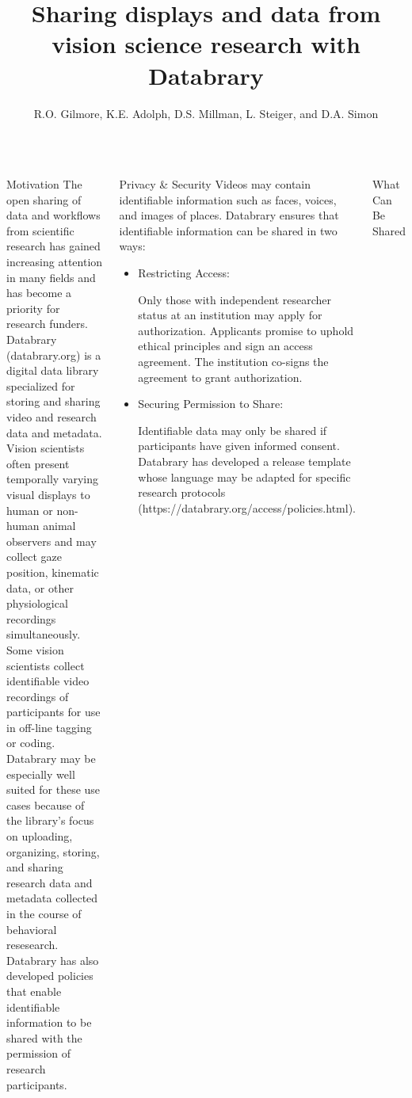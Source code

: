 \documentclass[final]{beamer}
\title{Sharing displays and data from vision science research with Databrary}
\author{R.O. Gilmore, K.E. Adolph, D.S. Millman, L. Steiger, and D.A. Simon}
\date{}
\begin{document}
\begin{frame}{} 

\begin{columns}[t]
		\begin{block}{Motivation}
			The open sharing of data and workflows from scientific research has gained increasing attention in many fields and has become a priority for research funders. 
			Databrary (databrary.org) is a digital data library specialized for storing and sharing video and research data and metadata. Vision scientists often present temporally varying visual displays to human or non-human animal observers and may collect gaze position, kinematic data, or other physiological recordings simultaneously. 
			Some vision scientists collect identifiable video recordings of participants for use in off-line tagging or coding. 
			Databrary may be especially well suited for these use cases because of the library's focus on uploading, organizing, storing, and sharing research data and metadata collected in the course of behavioral resesearch. 
			Databrary has also developed policies that enable identifiable information to be shared with the permission of research participants. 
		\end{block}
		\begin{block}{Privacy \& Security}
			Videos may contain identifiable information such as faces, voices, and images of places. 
			Databrary ensures that identifiable information can be shared in two ways:
			\begin{itemize}
			\item Restricting Access:
				\begin{indent}
					Only those with independent researcher status at an institution may apply for authorization. 
					Applicants promise to uphold ethical principles and sign an access agreement. The institution co-signs the agreement to grant authorization.
				\end{indent}
			\item Securing Permission to Share:
				\begin{indent}
					Identifiable data may only be shared if participants have given informed consent.
					Databrary has developed a release template whose language may be adapted for specific research protocols (https://databrary.org/access/policies.html).
				\end{indent}
			\end{itemize}
		\end{block}
		\begin{block}{What Can Be Shared}

\end{block}
\end{columns}
\end{frame}
\end{document}
